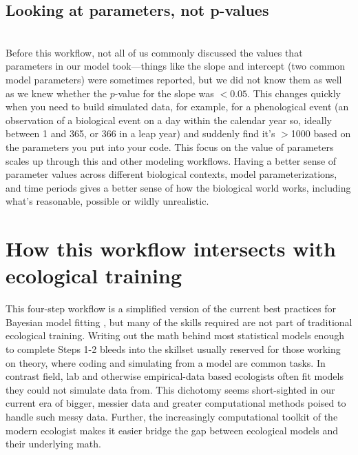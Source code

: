 \documentclass[11pt]{article}
\begin{document}
 \subsection*{Looking at parameters, not p-values} \\
Before this workflow, not all of us commonly discussed the values that parameters in our model took---things like the slope and intercept (two common model parameters) were sometimes reported, but we did not know them as well as we knew whether the $p$-value for the slope was $<0.05$. This changes quickly when you need to build simulated data, for example, for a phenological event (an observation of a biological event on a day within the calendar year so, ideally between 1 and 365, or 366 in a leap year) and suddenly find it's $>$1000 based on the parameters you put into your code. This focus on the value of parameters scales up through this and other modeling workflows. Having a better sense of parameter values across different biological contexts, model parameterizations, and time periods gives a better sense of how the biological world works, including what's reasonable, possible or wildly unrealistic. 

\section*{How this workflow intersects with ecological training} %

This four-step workflow is a simplified version of the current best practices for Bayesian model fitting  \citep{betanworkflow,vandeschoot2021}, but many of the skills required are not part of traditional ecological training. Writing out the math behind most statistical models enough to complete Steps 1-2 bleeds into the skillset usually reserved for those working on theory, where coding and simulating from a model are common tasks. In contrast field, lab and otherwise empirical-data based ecologists often fit models they could not simulate data from. This dichotomy seems short-sighted in our current era of bigger, messier data and greater computational methods poised to handle such messy data. Further, the increasingly computational toolkit of the modern ecologist makes it easier bridge the gap between ecological models and their underlying math. 
\end{document}
